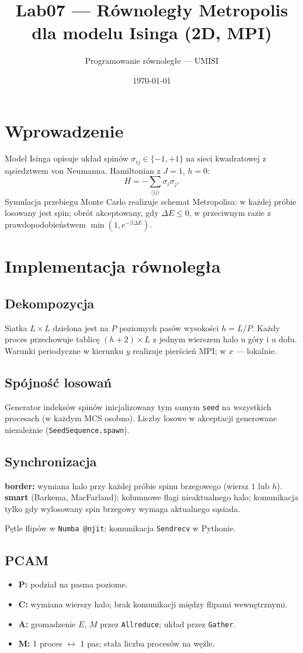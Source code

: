 \documentclass[11pt,a4paper]{article}
\title{Lab07 --- Równoległy Metropolis dla modelu Isinga (2D, MPI)}
\author{Programowanie równoległe --- UMISI}
\date{\today}
\begin{document}
\maketitle

\section{Wprowadzenie}
Model Isinga opisuje układ spinów $\sigma_{ij}\in\{-1,+1\}$ na sieci kwadratowej
z sąsiedztwem von Neumanna. Hamiltonian z $J=1$, $h=0$:
\[
H = -\sum_{\langle ij\rangle} \sigma_i \sigma_j .
\]
Symulacja przebiegu Monte Carlo realizuje schemat Metropolisa: w każdej próbie
losowany jest spin; obrót akceptowany, gdy $\Delta E\le 0$, w przeciwnym razie
z prawdopodobieństwem $\min(1,e^{-\beta\Delta E})$.

\section{Implementacja równoległa}
\subsection{Dekompozycja}
Siatka $L\times L$ dzielona jest na $P$ poziomych pasów wysokości $h=L/P$.
Każdy proces przechowuje tablicę $(h+2)\times L$ z jednym wierszem halo u góry i u dołu.
Warunki periodyczne w kierunku $y$ realizuje pierścień MPI; w $x$ --- lokalnie.

\subsection{Spójność losowań}
Generator indeksów spinów inicjalizowany tym samym \texttt{seed} na wszystkich
procesach (w każdym MCS osobno). Liczby losowe w akceptacji generowane niezależnie
(\texttt{SeedSequence.spawn}).

\subsection{Synchronizacja}
\textbf{border:} wymiana halo przy każdej próbie spinu brzegowego (wiersz $1$ lub $h$).
\textbf{smart} (Barkema, MacFarland): kolumnowe flagi nieaktualnego halo; komunikacja
tylko gdy wylosowany spin brzegowy wymaga aktualnego sąsiada.

Pętle flipów w \texttt{Numba @njit}; komunikacja \texttt{Sendrecv} w Pythonie.

\subsection{PCAM}
\begin{itemize}
  \item \textbf{P:} podział na pasma poziome.
  \item \textbf{C:} wymiana wierszy halo; brak komunikacji między flipami wewnętrznymi.
  \item \textbf{A:} gromadzenie $E$, $M$ przez \texttt{Allreduce}; układ przez \texttt{Gather}.
  \item \textbf{M:} 1 proces $\leftrightarrow$ 1 pas; stała liczba procesów na węźle.
\end{itemize}
\end{document}
